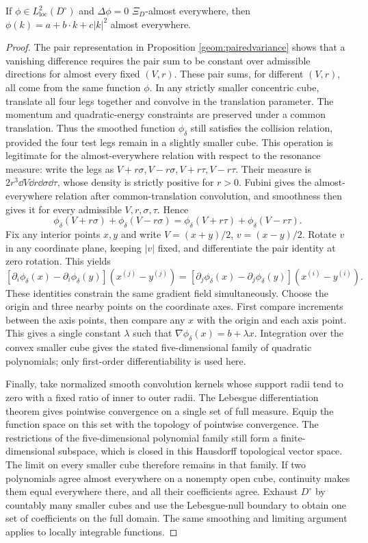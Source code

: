 \begin{lemma}\label{geom:invariants}
If $\phi\in L^2_{\mathrm{loc}}(D^\circ)$ and
$\Delta\phi=0$ $\Xi_D$-almost everywhere, then
$\phi(k)=a+b\cdot k+c|k|^2$ almost everywhere.
\end{lemma}
\begin{proof}
The pair representation in Proposition \ref{geom:pairedvariance} shows
that a vanishing difference requires the pair sum to be constant over
admissible directions for almost every fixed $(V,r)$. These pair sums,
for different $(V,r)$, all come from the same function $\phi$.
In any strictly smaller concentric cube, translate all four legs together
and convolve in the translation parameter. The momentum and quadratic-energy
constraints are preserved under a common translation. Thus the smoothed function
$\phi_\delta$ still satisfies the collision relation, provided the four
test legs remain in a slightly smaller cube.
This operation is legitimate for the almost-everywhere relation with
respect to the resonance measure: write the legs as
$V+r\sigma,V-r\sigma,V+r\tau,V-r\tau$. Their measure is
$2r^3\dd V\dd r\dd\sigma\dd\tau$, whose density is strictly positive
for $r>0$. Fubini gives the almost-everywhere relation after common-translation
convolution, and smoothness then gives it for every admissible
$V,r,\sigma,\tau$. Hence
\[
 \phi_\delta(V+r\sigma)+\phi_\delta(V-r\sigma)
 =\phi_\delta(V+r\tau)+\phi_\delta(V-r\tau).
\]
Fix any interior points $x,y$ and write
$V=(x+y)/2$, $v=(x-y)/2$. Rotate $v$ in any coordinate plane, keeping
$|v|$ fixed, and differentiate the pair identity at zero rotation. This yields
\[
 [\partial_i\phi_\delta(x)-\partial_i\phi_\delta(y)](x^{(j)}-y^{(j)})
 =[\partial_j\phi_\delta(x)-\partial_j\phi_\delta(y)](x^{(i)}-y^{(i)}).
\]
These identities constrain the same gradient field simultaneously.
Choose the origin and three nearby points on the coordinate axes.
First compare increments between the axis points, then compare any $x$
with the origin and each axis point. This gives a single constant $\lambda$
such that $\nabla\phi_\delta(x)=b+\lambda x$.
Integration over the convex smaller cube gives the stated five-dimensional
family of quadratic polynomials; only first-order differentiability is used here.

Finally, take normalized smooth convolution kernels whose support radii
tend to zero with a fixed ratio of inner to outer radii.
The Lebesgue differentiation theorem gives pointwise convergence on a
single set of full measure. Equip the function space on this set with
the topology of pointwise convergence. The restrictions of the
five-dimensional polynomial family still form a finite-dimensional subspace,
which is closed in this Hausdorff topological vector space.
The limit on every smaller cube therefore remains in that family.
If two polynomials agree almost everywhere on a nonempty open cube,
continuity makes them equal everywhere there, and all their coefficients
agree. Exhaust $D^\circ$ by countably many smaller cubes and use the
Lebesgue-null boundary to obtain one set of coefficients on the full domain.
The same smoothing and limiting argument applies to locally integrable functions.
\end{proof}

